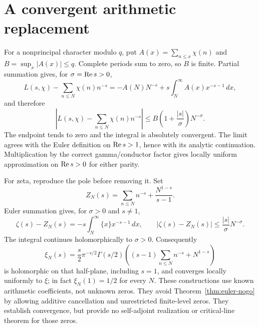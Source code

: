 \section{A convergent arithmetic replacement}
For a nonprincipal character modulo $q$, put
$A(x)=\sum_{n\le x}\chi(n)$ and $B=\sup_x|A(x)|\le q$.
Complete periods sum to zero, so $B$ is finite. Partial summation gives,
for $\sigma=\operatorname{Re} s>0$,
\[
 L(s,\chi)-\sum_{n\le N}\chi(n)n^{-s}
 =-A(N)N^{-s}+s\int_N^\infty A(x)x^{-s-1}\,dx,
\]
and therefore
\[
 \left|L(s,\chi)-\sum_{n\le N}\chi(n)n^{-s}\right|
 \le B\left(1+\frac{|s|}{\sigma}\right)N^{-\sigma}.
\]
The endpoint tends to zero and the integral is absolutely convergent.
The limit agrees with the Euler definition on $\operatorname{Re} s>1$, hence with
its analytic continuation. Multiplication by the correct gamma/conductor
factor gives locally uniform approximation on $\operatorname{Re} s>0$ for either parity.

For zeta, reproduce the pole before removing it. Set
\[
 Z_N(s)=\sum_{n\le N}n^{-s}+\frac{N^{1-s}}{s-1}.
\]
Euler summation gives, for $\sigma>0$ and $s\ne1$,
\[
 \zeta(s)-Z_N(s)=-s\int_N^\infty\{x\}x^{-s-1}\,dx,
 \qquad |\zeta(s)-Z_N(s)|\le\frac{|s|}{\sigma}N^{-\sigma}.
\]
The integral continues holomorphically to $\sigma>0$. Consequently
\[
 \xi_N(s)=\frac{s}{2}\pi^{-s/2}\Gamma(s/2)
 \left((s-1)\sum_{n\le N}n^{-s}+N^{1-s}\right)
\]
is holomorphic on that half-plane, including $s=1$, and converges
locally uniformly to $\xi$; in fact $\xi_N(1)=1/2$ for every $N$.
These constructions use known arithmetic coefficients, not unknown zeros.
They avoid Theorem~\ref{thm:euler-nogo} by allowing additive cancellation
and unrestricted finite-level zeros. They establish convergence, but
provide no self-adjoint realization or critical-line theorem for those zeros.

